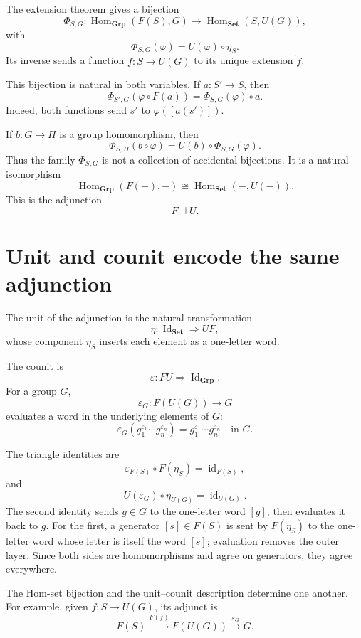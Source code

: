The extension theorem gives a bijection
\[
  \Phi_{S,G}:
  \operatorname{Hom}_{\mathbf{Grp}}(F(S),G)
  \longrightarrow
  \operatorname{Hom}_{\mathbf{Set}}(S,U(G)),
\]
with
\[
  \Phi_{S,G}(\varphi)=U(\varphi)\circ\eta_S.
\]
Its inverse sends a function \(f:S\to U(G)\) to its unique extension \(\widetilde f\).

This bijection is natural in both variables.  If \(a:S'\to S\), then
\[
  \Phi_{S',G}(\varphi\circ F(a))
  =\Phi_{S,G}(\varphi)\circ a.
\]
Indeed, both functions send \(s'\) to \(\varphi([a(s')])\).

If \(b:G\to H\) is a group homomorphism, then
\[
  \Phi_{S,H}(b\circ\varphi)
  =U(b)\circ\Phi_{S,G}(\varphi).
\]
Thus the family \(\Phi_{S,G}\) is not a collection of accidental bijections.  It is a natural isomorphism
\[
  \boxed{
  \operatorname{Hom}_{\mathbf{Grp}}(F(-),-)
  \cong
  \operatorname{Hom}_{\mathbf{Set}}(-,U(-)).}
\]
This is the adjunction
\[
  F\dashv U.
\]

\section{Unit and counit encode the same adjunction}

The unit of the adjunction is the natural transformation
\[
  \eta:\operatorname{Id}_{\mathbf{Set}}\Rightarrow UF,
\]
whose component \(\eta_S\) inserts each element as a one-letter word.

The counit is
\[
  \varepsilon:FU\Rightarrow\operatorname{Id}_{\mathbf{Grp}}.
\]
For a group \(G\),
\[
  \varepsilon_G:F(U(G))\to G
\]
evaluates a word in the underlying elements of \(G\):
\[
  \varepsilon_G(g_1^{\varepsilon_1}\cdots g_n^{\varepsilon_n})
  =g_1^{\varepsilon_1}\cdots g_n^{\varepsilon_n}
  \quad\text{in }G.
\]

The triangle identities are
\[
  \varepsilon_{F(S)}\circ F(\eta_S)
  =\operatorname{id}_{F(S)},
\]
and
\[
  U(\varepsilon_G)\circ\eta_{U(G)}
  =\operatorname{id}_{U(G)}.
\]
The second identity sends \(g\in G\) to the one-letter word \([g]\), then evaluates it back to \(g\).  For the first, a generator \([s]\in F(S)\) is sent by \(F(\eta_S)\) to the one-letter word whose letter is itself the word \([s]\); evaluation removes the outer layer.  Since both sides are homomorphisms and agree on generators, they agree everywhere.

The Hom-set bijection and the unit--counit description determine one another.  For example, given \(f:S\to U(G)\), its adjunct is
\[
  F(S)\xrightarrow{F(f)}F(U(G))
  \xrightarrow{\varepsilon_G}G.
\]

